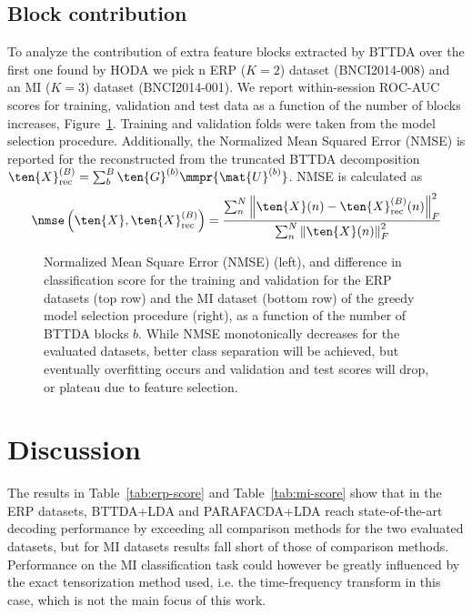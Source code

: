 \subsection{Block contribution}
To analyze the contribution of extra feature blocks extracted by {BTTDA} over
the first one found by HODA we pick n ERP ($K=2$) dataset
(BNCI2014-008) and an MI ($K=3$) dataset (BNCI2014-001).
We report within-session ROC-AUC scores for training, validation and test data as a function
of the number of blocks increases, Figure~\ref{fig:blocks}.
Training and validation folds were taken from the model selection procedure.
Additionally, the Normalized Mean Squared Error (NMSE) is reported for the
reconstructed from the truncated BTTDA decomposition
$\textstyle{\ten{X}_\text{rec}^{(B)}=\sum_b^B\ten{G}^{(b)}\mmpr{\mat{U}^{(b)}}}$.
NMSE is calculated as
\begin{equation}
	\nmse\left(\ten{X}, \ten{X}_\text{rec}^{(B)}\right) =
	\frac{\sum_n^N\left\lVert\ten{X}(n)-\ten{X}_\text{rec}^{(B)}(n)\right\rVert_F^2}
	{\sum_n^N\left\lVert\ten{X}(n)\right\rVert_F^2}
\end{equation}
\begin{figure}[t]
	
  \caption[Analysis of NMSE and classification score per block.]{%
    Normalized Mean Square Error (NMSE) (left), and difference in
    classification score for the training and validation for the ERP datasets
    (top row) and the MI dataset (bottom row)	of the greedy model selection
    procedure (right), as a function of the number of BTTDA blocks $b$.
		While NMSE monotonically decreases for the evaluated datasets, better class
		separation will be achieved, but eventually overfitting occurs and validation
		and test scores will drop, or plateau due to feature selection.
	}
	\label{fig:blocks}
\end{figure}


\section{Discussion}
The results in Table~\ref{tab:erp-score} and Table~\ref{tab:mi-score} show that
in the ERP datasets, BTTDA+LDA and PARAFACDA+LDA reach state-of-the-art decoding performance by
exceeding all comparison methods for the two evaluated datasets, but
for MI datasets results fall short of those of comparison methods.
Performance on the MI classification task could however be greatly influenced
by the exact tensorization method used, i.e. the time-frequency transform in
this case, which is not the main focus of this work.

